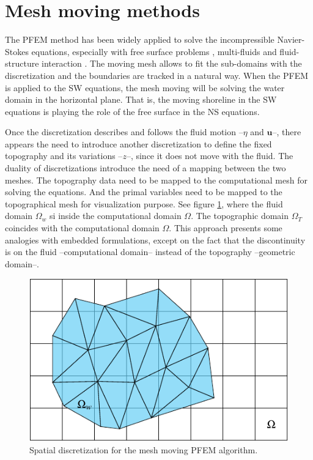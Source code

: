 \section{Mesh moving methods}


The PFEM method has been widely applied to solve the incompressible Navier-Stokes equations, especially with free surface problems \cite{larese2008}, multi-fluids \cite{mier2010} and fluid-structure interaction \cite{onate2008}.
The moving mesh allows to fit the sub-domains with the discretization and the boundaries are tracked in a natural way.
When the PFEM is applied to the SW equations, the mesh moving will be solving the water domain in the horizontal plane. That is, the moving shoreline in the SW equations is playing the role of the free surface in the NS equations.

Once the discretization describes and follows the fluid motion --$\eta$ and $\mathbf{u}$--, there appears the need to introduce another discretization to define the fixed topography and its variations --$z$--, since it does not move with the fluid. The duality of discretizations introduce the need of a mapping between the two meshes. The topography data need to be mapped to the computational mesh for solving the equations. And the primal variables need to be mapped to the topographical mesh for visualization purpose. See figure \ref{pfem_dual_mesh}, where the fluid domain $\Omega_w$ si inside the computational domain $\Omega$. The topographic domain $\Omega_T$ coincides with the computational domain $\Omega$.
This approach presents some analogies with embedded formulations, except on the fact that the discontinuity is on the fluid --computational domain-- instead of the topography --geometric domain--.


\begin{figure} [ht]
    \centering
    \includegraphics[width=.6\textwidth]{img/lagrangian/dual_pfem_mesh.pdf}
    \caption{Spatial discretization for the mesh moving PFEM algorithm.}
    \label{pfem_dual_mesh}
\end{figure}

